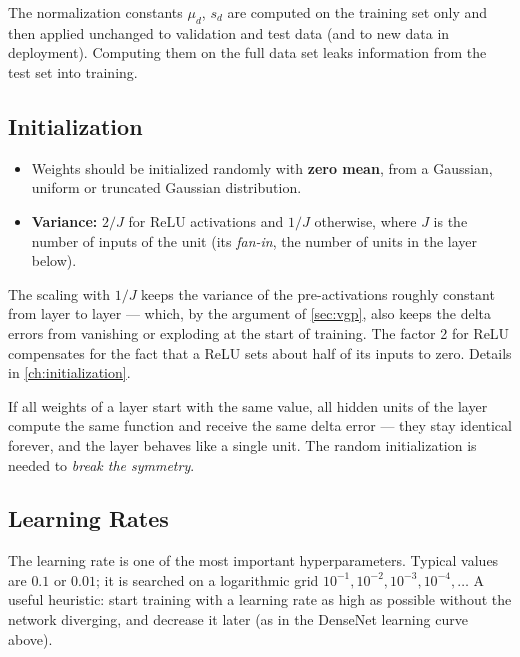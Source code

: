 \documentclass[11pt, oneside]{book}
\let\originalsubsection\subsection
\renewcommand{\subsection}{\Needspace{6\baselineskip}\originalsubsection}
\begin{document}
\begin{notebox}[title={Use the training statistics everywhere}]
The normalization constants $\mu_d$, $s_d$ are computed on the training set
only and then applied unchanged to validation and test data (and to new
data in deployment). Computing them on the full data set leaks information
from the test set into training.
\end{notebox}

\subsection{Initialization}

\begin{itemize}
  \item Weights should be initialized randomly with \textbf{zero mean}, from
    a Gaussian, uniform or truncated Gaussian distribution.
  \item \textbf{Variance:} $2/J$ for ReLU activations and $1/J$ otherwise,
    where $J$ is the number of inputs of the unit (its \emph{fan-in}, the
    number of units in the layer below).
\end{itemize}
The scaling with $1/J$ keeps the variance of the pre-activations roughly
constant from layer to layer --- which, by the argument of \cref{sec:vgp},
also keeps the delta errors from vanishing or exploding at the start of
training. The factor 2 for ReLU compensates for the fact that a ReLU sets
about half of its inputs to zero. Details in \cref{ch:initialization}.

\begin{notebox}[title={Why not initialize all weights with zero?}]
If all weights of a layer start with the same value, all hidden units of
the layer compute the same function and receive the same delta error ---
they stay identical forever, and the layer behaves like a single unit. The
random initialization is needed to \emph{break the symmetry}.
\end{notebox}

\subsection{Learning Rates}

The learning rate is one of the most important hyperparameters. Typical
values are $0.1$ or $0.01$; it is searched on a logarithmic grid
$10^{-1}, 10^{-2}, 10^{-3}, 10^{-4}, \dots$ A useful heuristic: start
training with a learning rate as high as possible without the network
diverging, and decrease it later (as in the DenseNet learning curve above).
\end{document}

